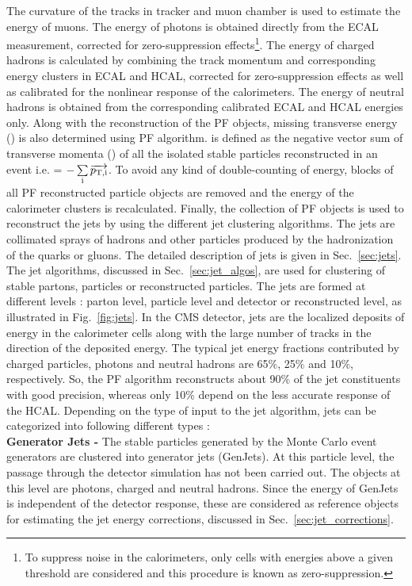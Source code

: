 The curvature of the tracks in tracker and muon chamber is used to estimate the energy of muons. The energy of photons is obtained directly from the ECAL measurement, corrected for zero-suppression effects\footnote{To suppress noise in the calorimeters, only cells with energies above a given threshold are considered and this procedure is known as zero-suppression.}. The energy of charged hadrons is calculated by combining the track momentum and corresponding energy clusters in ECAL and HCAL, corrected for zero-suppression effects as well as calibrated for the nonlinear response of the calorimeters. The energy of neutral hadrons is obtained from the corresponding calibrated ECAL and HCAL energies only. Along with the reconstruction of the PF objects, missing transverse energy (\ETmiss) is also determined using PF algorithm. \ETmiss is defined as the negative vector sum of transverse momenta (\pt) of all the isolated stable particles reconstructed in an event i.e. \ETmiss = $-\sum\limits_{\rm i}^{}\overrightarrow{p_{\rm T,i}}$. To avoid any kind of double-counting of energy, blocks of all PF reconstructed particle objects are removed and the energy of the calorimeter clusters is recalculated. Finally, the collection of PF objects is used to reconstruct the jets by using the different jet clustering algorithms. The jets are collimated sprays of hadrons and other particles produced by the hadronization of the quarks or gluons. The detailed description of jets is given in Sec.~\ref{sec:jets}. The jet algorithms, discussed in Sec.~\ref{sec:jet_algos}, are used for clustering of stable partons, particles or reconstructed particles. The jets are formed at different levels : parton level, particle level and detector or reconstructed level, as illustrated in Fig.~\ref{fig:jets}. In the CMS detector, jets are the localized deposits of energy in the calorimeter cells along with the large number of tracks in the direction of the deposited energy. The typical jet energy fractions contributed by charged particles, photons and neutral hadrons are
65\%, 25\% and 10\%, respectively. So, the PF algorithm reconstructs about 90\% of the jet constituents with good precision, whereas only 10\% depend on the less accurate response of the HCAL. Depending on the type of input to the jet algorithm, jets can be categorized into following different types :\\ \newline 
{\bf Generator Jets -} The stable particles generated by the Monte Carlo event generators are clustered into generator jets (GenJets). At this particle level, the passage through the detector simulation has not been carried out. The objects at this level are photons, charged and neutral hadrons. Since the energy of GenJets is independent of the detector response, these are considered as reference objects for estimating the jet energy corrections, discussed in Sec.~\ref{sec:jet_corrections}. \\ \newline
